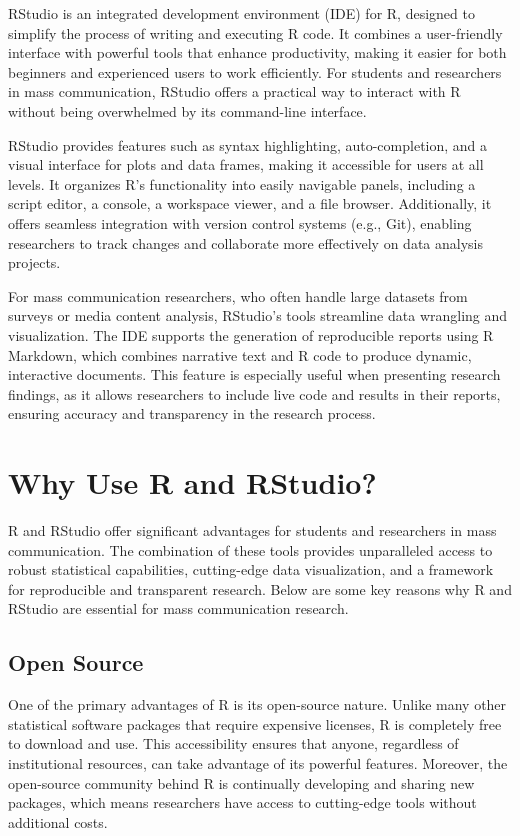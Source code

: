 \documentclass[
]{book}
\begin{document}
RStudio is an integrated development environment (IDE) for R, designed to simplify the process of writing and executing R code. It combines a user-friendly interface with powerful tools that enhance productivity, making it easier for both beginners and experienced users to work efficiently. For students and researchers in mass communication, RStudio offers a practical way to interact with R without being overwhelmed by its command-line interface.

RStudio provides features such as syntax highlighting, auto-completion, and a visual interface for plots and data frames, making it accessible for users at all levels. It organizes R's functionality into easily navigable panels, including a script editor, a console, a workspace viewer, and a file browser. Additionally, it offers seamless integration with version control systems (e.g., Git), enabling researchers to track changes and collaborate more effectively on data analysis projects.

For mass communication researchers, who often handle large datasets from surveys or media content analysis, RStudio's tools streamline data wrangling and visualization. The IDE supports the generation of reproducible reports using R Markdown, which combines narrative text and R code to produce dynamic, interactive documents. This feature is especially useful when presenting research findings, as it allows researchers to include live code and results in their reports, ensuring accuracy and transparency in the research process.

\section{Why Use R and RStudio?}\label{why-use-r-and-rstudio}

R and RStudio offer significant advantages for students and researchers in mass communication. The combination of these tools provides unparalleled access to robust statistical capabilities, cutting-edge data visualization, and a framework for reproducible and transparent research. Below are some key reasons why R and RStudio are essential for mass communication research.

\subsection*{Open Source}\label{open-source}

One of the primary advantages of R is its open-source nature. Unlike many other statistical software packages that require expensive licenses, R is completely free to download and use. This accessibility ensures that anyone, regardless of institutional resources, can take advantage of its powerful features. Moreover, the open-source community behind R is continually developing and sharing new packages, which means researchers have access to cutting-edge tools without additional costs.
\end{document}
